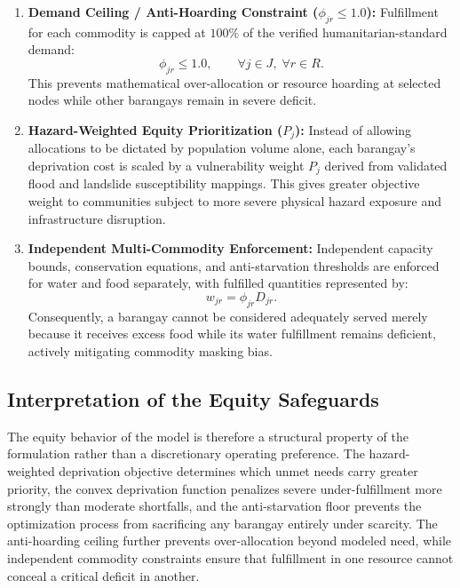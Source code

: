 \begin{enumerate}
    \item \textbf{Demand Ceiling / Anti-Hoarding Constraint ($\phi_{jr} \le 1.0$):} 
    Fulfillment for each commodity is capped at $100\%$ of the verified humanitarian-standard demand:
    \begin{equation}
        \phi_{jr} \le 1.0, \qquad \forall j \in J, \; \forall r \in R.
    \end{equation}
    This prevents mathematical over-allocation or resource hoarding at selected nodes while other barangays remain in severe deficit.

    \item \textbf{Hazard-Weighted Equity Prioritization ($P_j$):} 
    Instead of allowing allocations to be dictated by population volume alone, each barangay's deprivation cost is scaled by a vulnerability weight $P_j$ derived from validated flood and landslide susceptibility mappings. This gives greater objective weight to communities subject to more severe physical hazard exposure and infrastructure disruption.

    \item \textbf{Independent Multi-Commodity Enforcement:} 
    Independent capacity bounds, conservation equations, and anti-starvation thresholds are enforced for water and food separately, with fulfilled quantities represented by:
    \begin{equation}
        w_{jr} = \phi_{jr} D_{jr}.
    \end{equation}
    Consequently, a barangay cannot be considered adequately served merely because it receives excess food while its water fulfillment remains deficient, actively mitigating commodity masking bias.
\end{enumerate}

\subsection{Interpretation of the Equity Safeguards}
The equity behavior of the model is therefore a structural property of the formulation rather than a discretionary operating preference. The hazard-weighted deprivation objective determines which unmet needs carry greater priority, the convex deprivation function penalizes severe under-fulfillment more strongly than moderate shortfalls, and the anti-starvation floor prevents the optimization process from sacrificing any barangay entirely under scarcity. The anti-hoarding ceiling further prevents over-allocation beyond modeled need, while independent commodity constraints ensure that fulfillment in one resource cannot conceal a critical deficit in another.

